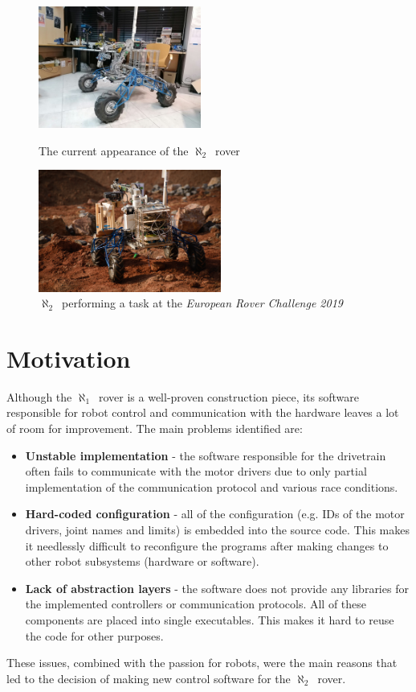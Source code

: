 \documentclass[english,inz,shortabstract]{iithesis}
\newcommand{\oldrovername}{$\aleph_1$\ }
\newcommand{\rovername}{$\aleph_2$\ }
\begin{document}
\begin{figure}[ht]
    \hspace*{\fill}
    \begin{minipage}{.45\textwidth}
      \centering
      \includegraphics[height=4cm]{img/lazik1.jpg}
      \caption{The current appearance of the \rovername rover}
      \label{fig:lazik1}
    \end{minipage}
    \hfill
    \begin{minipage}{.45\textwidth}
      \centering
      \includegraphics[height=4cm]{img/lazik2.jpg}
      \caption{\rovername performing a task at the \textit{European Rover Challenge 2019}}
      \label{fig:lazik2}
    \end{minipage}
    \hspace*{\fill}
\end{figure}

\section{Motivation}
Although the \oldrovername rover is a well-proven construction piece, its software responsible for robot control and communication with the hardware leaves a lot of room for improvement. The main problems identified are:
\begin{itemize}
    \item \textbf{Unstable implementation} - the software responsible for the drivetrain often fails to communicate with the motor drivers due to only partial implementation of the communication protocol and various race conditions.
    \item \textbf{Hard-coded configuration} - all of the configuration (e.g. IDs of the motor drivers, joint names and limits) is embedded into the source code. This makes it needlessly difficult to reconfigure the programs after making changes to other robot subsystems (hardware or software).
    \item \textbf{Lack of abstraction layers} - the software does not provide any libraries for the implemented controllers or communication protocols. All of these components are placed into single executables. This makes it hard to reuse the code for other purposes.
\end{itemize}
These issues, combined with the passion for robots, were the main reasons that led to the decision of making new control software for the \rovername rover.
\end{document}
